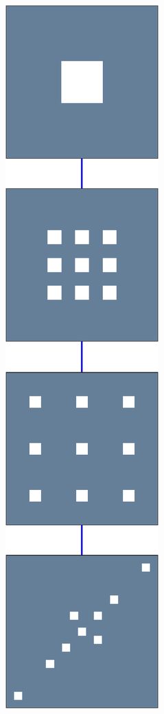 \begin{figure}[!ht]
\begin{subfigure}[b]{0.09\textwidth}
	\includegraphics[width=\textwidth]{figures/exple-better-support/tree_expected.pdf}

\end{subfigure}
\end{figure}
